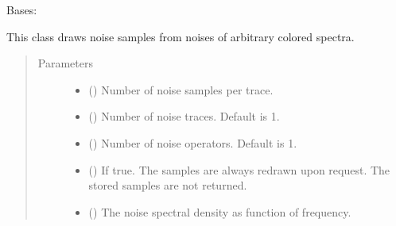\documentclass[letterpaper,10pt,english]{sphinxmanual}
\begin{document}
\begin{fulllineitems}
\label{\detokenize{qsim:qsim.noise.NTGColoredNoise}}
Bases: {\hyperref[\detokenize{qsim:qsim.noise.NoiseTraceGenerator}]{}}

This class draws noise samples from noises of arbitrary colored spectra.
\begin{quote}\begin{description}
\item[{Parameters}] \leavevmode\begin{itemize}
\item {} 
 () \textendash{} Number of noise samples per trace.

\item {} 
 (\sphinxstyleliteralemphasis{\sphinxupquote{, }}) \textendash{} Number of noise traces. Default is 1.

\item {} 
 (\sphinxstyleliteralemphasis{\sphinxupquote{, }}) \textendash{} Number of noise operators. Default is 1.

\item {} 
 () \textendash{} If true. The samples are always redrawn upon request. The stored samples
are not returned.

\item {} 
 () \textendash{} The noise spectral density as function of frequency.


\end{itemize}
\end{description}
\end{quote}
\end{fulllineitems}
\end{document}
